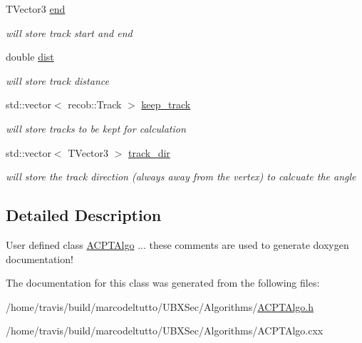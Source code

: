 \begin{DoxyCompactItemize}
\item 
\hypertarget{classubxsec_1_1ACPTAlgo_af00d6d052adec3602acb3a8eee032679}{\-T\-Vector3 \hyperlink{classubxsec_1_1ACPTAlgo_af00d6d052adec3602acb3a8eee032679}{end}}\label{classubxsec_1_1ACPTAlgo_af00d6d052adec3602acb3a8eee032679}

\begin{DoxyCompactList}\small\item\em will store track start and end \end{DoxyCompactList}\item 
\hypertarget{classubxsec_1_1ACPTAlgo_a99ba7b169c1dd4e7ffaf9ad943939879}{double \hyperlink{classubxsec_1_1ACPTAlgo_a99ba7b169c1dd4e7ffaf9ad943939879}{dist}}\label{classubxsec_1_1ACPTAlgo_a99ba7b169c1dd4e7ffaf9ad943939879}

\begin{DoxyCompactList}\small\item\em will store track distance \end{DoxyCompactList}\item 
\hypertarget{classubxsec_1_1ACPTAlgo_a8b260c612412c091693f6db963ae933a}{std\-::vector$<$ recob\-::\-Track $>$ \hyperlink{classubxsec_1_1ACPTAlgo_a8b260c612412c091693f6db963ae933a}{keep\-\_\-track}}\label{classubxsec_1_1ACPTAlgo_a8b260c612412c091693f6db963ae933a}

\begin{DoxyCompactList}\small\item\em will store tracks to be kept for calculation \end{DoxyCompactList}\item 
\hypertarget{classubxsec_1_1ACPTAlgo_a6e27c240684a479e01afe5713bec5bd9}{std\-::vector$<$ \-T\-Vector3 $>$ \hyperlink{classubxsec_1_1ACPTAlgo_a6e27c240684a479e01afe5713bec5bd9}{track\-\_\-dir}}\label{classubxsec_1_1ACPTAlgo_a6e27c240684a479e01afe5713bec5bd9}

\begin{DoxyCompactList}\small\item\em will store the track direction (always away from the vertex) to calcuate the angle \end{DoxyCompactList}\end{DoxyCompactItemize}


\subsection{\-Detailed \-Description}
\-User defined class \hyperlink{classubxsec_1_1ACPTAlgo}{\-A\-C\-P\-T\-Algo} ... these comments are used to generate doxygen documentation! 

\-The documentation for this class was generated from the following files\-:\begin{DoxyCompactItemize}
\item 
/home/travis/build/marcodeltutto/\-U\-B\-X\-Sec/\-Algorithms/\hyperlink{ACPTAlgo_8h}{\-A\-C\-P\-T\-Algo.\-h}\item 
/home/travis/build/marcodeltutto/\-U\-B\-X\-Sec/\-Algorithms/\-A\-C\-P\-T\-Algo.\-cxx\end{DoxyCompactItemize}

